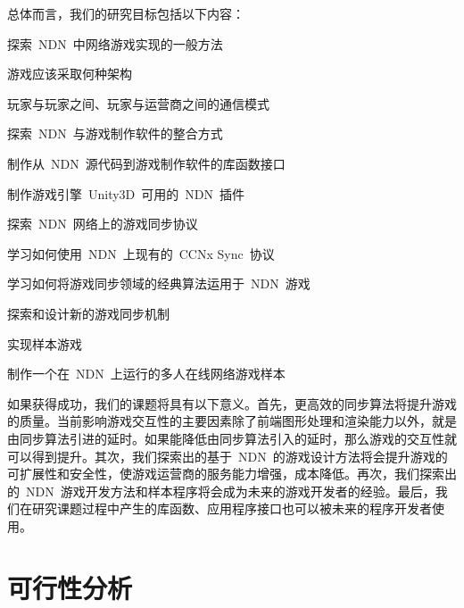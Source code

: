 总体而言，我们的研究目标包括以下内容：
\begin{itemize*}
\item 探索~NDN~中网络游戏实现的一般方法
  \begin{itemize*}
  \item 游戏应该采取何种架构
  \item 玩家与玩家之间、玩家与运营商之间的通信模式
  \end{itemize*}
\item 探索~NDN~与游戏制作软件的整合方式
  \begin{itemize*}
  \item 制作从~NDN~源代码到游戏制作软件的库函数接口
  \item 制作游戏引擎~Unity3D~可用的~NDN~插件
  \end{itemize*}
\item 探索~NDN~网络上的游戏同步协议
  \begin{itemize*}
  \item 学习如何使用~NDN~上现有的~CCNx Sync~协议\cite{CCNxSync}
  \item 学习如何将游戏同步领域的经典算法运用于~NDN~游戏
  \item 探索和设计新的游戏同步机制
  \end{itemize*}
\item 实现样本游戏
  \begin{itemize*}
  \item 制作一个在~NDN~上运行的多人在线网络游戏样本
  \end{itemize*}
\end{itemize*}

如果获得成功，我们的课题将具有以下意义。首先，更高效的同步算法将提升游戏的质量。当前影响游戏交互性的主要因素除了前端图形处理和渲染能力以外，就是由同步算法引进的延时。如果能降低由同步算法引入的延时，那么游戏的交互性就可以得到提升。其次，我们探索出的基于~NDN~的游戏设计方法将会提升游戏的可扩展性和安全性，使游戏运营商的服务能力增强，成本降低。再次，我们探索出的~NDN~游戏开发方法和样本程序将会成为未来的游戏开发者的经验。最后，我们在研究课题过程中产生的库函数、应用程序接口也可以被未来的程序开发者使用。

\section{可行性分析}

